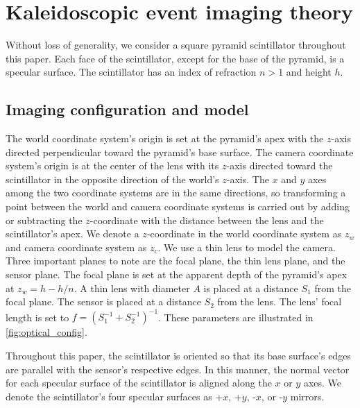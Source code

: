 
\section{Kaleidoscopic event imaging theory} \label{sec:theory}

Without loss of generality, we consider a square pyramid scintillator throughout 
this paper. 
Each face of the scintillator, except for the base of the pyramid, is a specular surface.
The scintillator has an index of refraction $n>1$ and height $h$.

\subsection{Imaging configuration and model}

The world coordinate system's origin is set at the pyramid's apex with the 
$z$-axis directed perpendicular toward the pyramid's base surface.
The camera coordinate system's origin is at the center of the lens with its 
$z$-axis directed toward the scintillator in the opposite direction of the world's $z$-axis.
The $x$ and $y$ axes among the two coordinate systems are in the same directions, 
so transforming a point between the world and camera coordinate systems is 
carried out by adding or subtracting the $z$-coordinate with the distance between 
the lens and the scintillator's apex.
We denote a $z$-coordinate in the world coordinate system as $z_w$ and camera 
coordinate system as $z_c$.
We use a thin lens to model the camera.
Three important planes to note are the focal plane, the thin lens plane, and the 
sensor plane.
The focal plane is set at the apparent depth of the pyramid's apex at $z_w=h-h/n$.
A thin lens with diameter $A$ is placed at a distance $S_1$ from the focal plane. 
The sensor is placed at a distance $S_2$ from the lens.
The lens' focal length is set to $f=(S_1^{-1}+S_2^{-1})^{-1}$.
These parameters are illustrated in \cref{fig:optical_config}.

Throughout this paper, the scintillator is oriented so that its base surface's 
edges are parallel with the sensor's respective edges. 
In this manner, the normal vector for each specular surface of the scintillator is 
aligned along the $x$ or $y$ axes.
We denote the scintillator's four specular surfaces as +$x$, +$y$, -$x$, or -$y$ mirrors.


